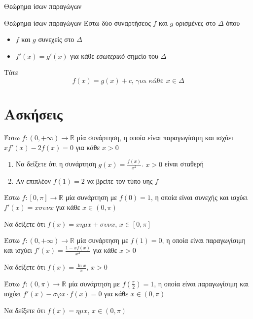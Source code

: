 \documentclass{presentation}
\begin{document}
\begin{frame}{Θεώρημα ίσων παραγώγων}
    \begin{block}{Θεώρημα ίσων παραγώγων}
        Έστω δύο συναρτήσεος $f$ και $g$ ορισμένες στο $Δ$ όπου
        \begin{itemize}
            \item $f$ και $g$ συνεχείς στο $Δ$
            \item $f'(x)=g'(x)$ για κάθε \emph{εσωτερικό} σημείο του $Δ$
        \end{itemize}
        Τότε
        $$f(x)=g(x)+c \text{, για κάθε } x\in Δ$$
    \end{block}
\end{frame}

\section{Ασκήσεις}
\begin{askisi}
    Έστω $f:(0,+\infty)\to\mathbb{R}$ μία συνάρτηση, η οποία είναι παραγωγίσιμη και ισχύει $xf'(x)-2f(x)=0$ για κάθε $x>0$
    \begin{enumerate}
        \item<1-> Να δείξετε ότι η συνάρτηση $g(x)=\frac{f(x)}{x^2}$. $x>0$ είναι σταθερή
        \item<2-> Αν επιπλέον $f(1)=2$ να βρείτε τον τύπο υης $f$
    \end{enumerate}

\end{askisi}

\begin{askisi}
    Έστω $f:[0,π]\to\mathbb{R}$ μία συνάρτηση με $f(0)=1$, η οποία είναι συνεχής και ισχύει $f'(x)=xσυνx$ για κάθε $x\in (0,π)$

    Να δείξετε ότι $f(x)=xημx+συνx$, $x\in [0,π]$

\end{askisi}

\begin{askisi}
    Έστω $f:(0,+\infty)\to\mathbb{R}$ μία συνάρτηση με $f(1)=0$, η οποία είναι παραγωγίσιμη και ισχύει $f'(x)=\frac{1-xf(x)}{x^2}$ για κάθε $x>0$

    Να δείξετε ότι $f(x)=\frac{\ln x}{x}$, $x>0$

\end{askisi}

\begin{askisi}
    Έστω $f:(0,π)\to\mathbb{R}$ μία συνάρτηση με $f(\frac{π}{2})=1$, η οποία είναι παραγωγίσιμη και ισχύει $f'(x)-σφx\cdot f(x)=0$ για κάθε $x\in (0,π)$

    Να δείξετε ότι $f(x)=ημx$, $x\in (0,π)$

\end{askisi}
\end{document}
